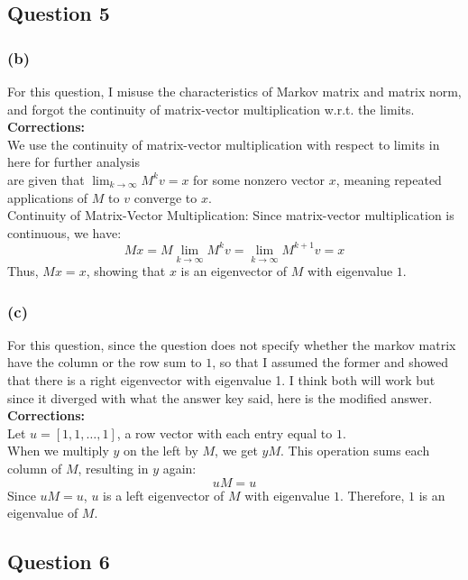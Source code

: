 \documentclass[12pt]{article}
\newcounter{entry}
\begin{document}
\subsection*{Question 5}

\subsubsection{(b)}
For this question, I misuse the characteristics of Markov matrix and matrix norm, and forgot the continuity of matrix-vector multiplication w.r.t. the limits.
\\
\textbf{Corrections: }
\\
We use the continuity of matrix-vector multiplication with respect to limits in here for further analysis
\\
 are given that \( \lim_{k \to \infty} M^k v = x \) for some nonzero vector \( x \), meaning repeated applications of \( M \) to \( v \) converge to \( x \).
\\
Continuity of Matrix-Vector Multiplication: Since matrix-vector multiplication is continuous, we have:
\[
   M x = M \lim_{k \to \infty} M^k v = \lim_{k \to \infty} M^{k+1} v = x
\]
Thus, \( M x = x \), showing that \( x \) is an eigenvector of \( M \) with eigenvalue \( 1 \).

\subsubsection{(c)}
For this question, since the question does not specify whether the markov matrix have the column or the row sum to $1$, so that I assumed the former and showed that there is a right eigenvector with eigenvalue 1.
I think both will work but since it diverged with what the answer key said, here is the modified answer.
\\
\textbf{Corrections: }
\\
Let \( u = [1, 1, \dots, 1] \), a row vector with each entry equal to $1$.
\\
When we multiply \( y \) on the left by \( M \), we get \( y M \). This operation sums each column of \( M \), resulting in \( y \) again:
\[
    u M = u
\]
Since \( u M = u \), \( u \) is a left eigenvector of \( M \) with eigenvalue \( 1 \). Therefore, \( 1 \) is an eigenvalue of \( M \).

\subsection*{Question 6}
\end{document}

